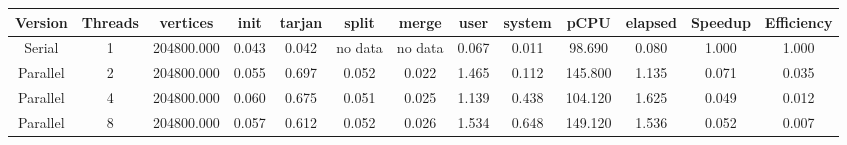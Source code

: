 \begin{tabular}{|c|c|c|c|c|c|c|c|c|c|c|c|c|}
\toprule
 Version &  Threads &   vertices &  init &  tarjan &   split &   merge &  user &  system &    pCPU &  elapsed &  Speedup &  Efficiency \\
\midrule
  Serial &        1 & 204800.000 & 0.043 &   0.042 & no data & no data & 0.067 &   0.011 &  98.690 &    0.080 &    1.000 &       1.000 \\
Parallel &        2 & 204800.000 & 0.055 &   0.697 &   0.052 &   0.022 & 1.465 &   0.112 & 145.800 &    1.135 &    0.071 &       0.035 \\
Parallel &        4 & 204800.000 & 0.060 &   0.675 &   0.051 &   0.025 & 1.139 &   0.438 & 104.120 &    1.625 &    0.049 &       0.012 \\
Parallel &        8 & 204800.000 & 0.057 &   0.612 &   0.052 &   0.026 & 1.534 &   0.648 & 149.120 &    1.536 &    0.052 &       0.007 \\
\bottomrule
\end{tabular}
